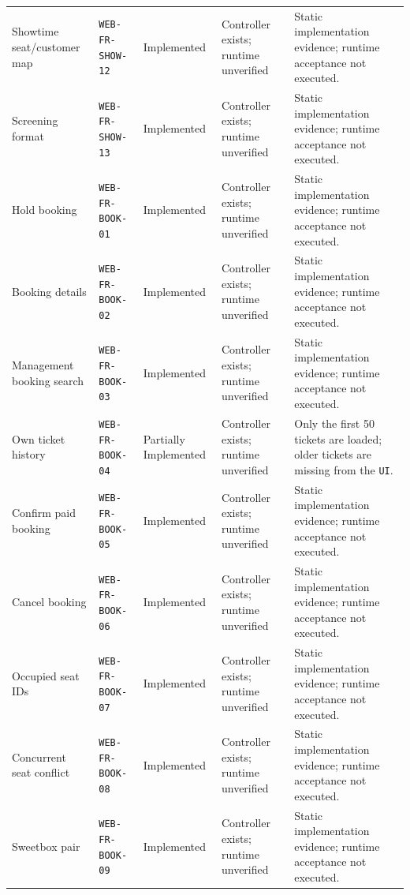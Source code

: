 \begin{longtable}{@{}P{0.19000\SRSWidth}P{0.18000\SRSWidth}P{0.15000\SRSWidth}P{0.20000\SRSWidth}P{0.28000\SRSWidth}@{}}
Showtime seat/\allowbreak{}customer map & \texttt{WEB-\allowbreak{}FR-\allowbreak{}SHOW-\allowbreak{}12} & Implemented & Controller exists; runtime unverified & Static implementation evidence; runtime acceptance not executed. \\[3pt]
Screening format & \texttt{WEB-\allowbreak{}FR-\allowbreak{}SHOW-\allowbreak{}13} & Implemented & Controller exists; runtime unverified & Static implementation evidence; runtime acceptance not executed. \\[3pt]
Hold booking & \texttt{WEB-\allowbreak{}FR-\allowbreak{}BOOK-\allowbreak{}01} & Implemented & Controller exists; runtime unverified & Static implementation evidence; runtime acceptance not executed. \\[3pt]
Booking details & \texttt{WEB-\allowbreak{}FR-\allowbreak{}BOOK-\allowbreak{}02} & Implemented & Controller exists; runtime unverified & Static implementation evidence; runtime acceptance not executed. \\[3pt]
Management booking search & \texttt{WEB-\allowbreak{}FR-\allowbreak{}BOOK-\allowbreak{}03} & Implemented & Controller exists; runtime unverified & Static implementation evidence; runtime acceptance not executed. \\[3pt]
Own ticket history & \texttt{WEB-\allowbreak{}FR-\allowbreak{}BOOK-\allowbreak{}04} & Partially Implemented & Controller exists; runtime unverified & Only the first 50 tickets are loaded; older tickets are missing from the \texttt{UI}. \\[3pt]
Confirm paid booking & \texttt{WEB-\allowbreak{}FR-\allowbreak{}BOOK-\allowbreak{}05} & Implemented & Controller exists; runtime unverified & Static implementation evidence; runtime acceptance not executed. \\[3pt]
Cancel booking & \texttt{WEB-\allowbreak{}FR-\allowbreak{}BOOK-\allowbreak{}06} & Implemented & Controller exists; runtime unverified & Static implementation evidence; runtime acceptance not executed. \\[3pt]
Occupied seat IDs & \texttt{WEB-\allowbreak{}FR-\allowbreak{}BOOK-\allowbreak{}07} & Implemented & Controller exists; runtime unverified & Static implementation evidence; runtime acceptance not executed. \\[3pt]
Concurrent seat conflict & \texttt{WEB-\allowbreak{}FR-\allowbreak{}BOOK-\allowbreak{}08} & Implemented & Controller exists; runtime unverified & Static implementation evidence; runtime acceptance not executed. \\[3pt]
Sweetbox pair & \texttt{WEB-\allowbreak{}FR-\allowbreak{}BOOK-\allowbreak{}09} & Implemented & Controller exists; runtime unverified & Static implementation evidence; runtime acceptance not executed. \\[3pt]

\end{longtable}
